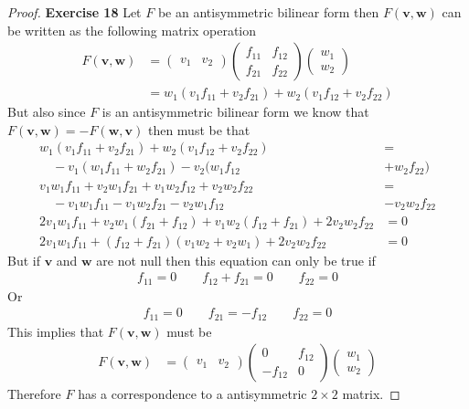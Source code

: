 \documentclass[11pt]{article}
\theoremstyle{definition}
\begin{document}
\begin{proof}{\textbf{Exercise 18}}
    Let $F$ be an antisymmetric bilinear form then $F(\bm{v}, \bm{w})$ can be
    written as the following matrix operation
    \begin{align*}
        F(\bm{v}, \bm{w})
        &= \begin{pmatrix} v_1 & v_2 \end{pmatrix}
        \begin{pmatrix}
            f_{11} & f_{12}\\ f_{21} & f_{22}
        \end{pmatrix}
        \begin{pmatrix} w_1 \\ w_2 \end{pmatrix}\\
        &= w_1(v_1f_{11} + v_2f_{21}) + w_2(v_1f_{12} + v_2f_{22})
    \end{align*}
    But also since $F$ is an antisymmetric bilinear form we know that\\
    $F(\bm{v}, \bm{w}) = - F(\bm{w}, \bm{v})$ then must be that
    \begin{align*}
        w_1(v_1f_{11} + v_2f_{21}) + w_2(v_1f_{12} + v_2f_{22}) &=\\
        \quad -v_1(w_1f_{11} + w_2f_{21}) - v_2(w_1f_{12} &+ w_2f_{22})\\
        v_1w_1f_{11} + v_2w_1f_{21} + v_1w_2f_{12} + v_2w_2f_{22} &=\\
        \quad -v_1w_1f_{11} - v_1w_2f_{21} - v_2w_1f_{12} &-v_2w_2f_{22}\\
        2v_1w_1f_{11} + v_2w_1(f_{21} + f_{12}) + v_1w_2(f_{12} + f_{21})
        + 2v_2w_2f_{22} &= 0\\
        2v_1w_1f_{11} + (f_{12} + f_{21})(v_1w_2 + v_2w_1)
        + 2v_2w_2f_{22} &= 0
    \end{align*}
    But if $\bm{v}$ and $\bm{w}$ are not null then this equation can only be
    true if
    \begin{align*}
        f_{11} = 0 \qquad f_{12} + f_{21} = 0\qquad f_{22} = 0
    \end{align*}
    Or
    \begin{align*}
        f_{11} = 0 \qquad f_{21} = -f_{12}\qquad f_{22} = 0
    \end{align*}
    This implies that $F(\bm{v}, \bm{w})$ must be
    \begin{align*}
        F(\bm{v}, \bm{w})
        &= \begin{pmatrix} v_1 & v_2 \end{pmatrix}
        \begin{pmatrix}
            0 & f_{12}\\ -f_{12} & 0
        \end{pmatrix}
        \begin{pmatrix} w_1 \\ w_2 \end{pmatrix}
    \end{align*}
    Therefore $F$ has a correspondence to a antisymmetric $2\times2$ matrix.
\end{proof}
\end{document}
